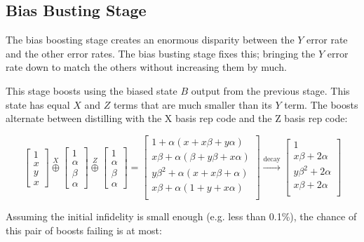 \documentclass[onecolumn,unpublished,a4paper]{quantumarticle}
\theoremstyle{definition}
\theoremstyle{definition}
\theoremstyle{definition}
\begin{document}
\subsection{Bias Busting Stage}

The bias boosting stage creates an enormous disparity between the $Y$ error rate and the other error rates.
The bias busting stage fixes this; bringing the $Y$ error rate down to match the others without increasing them by much.

This stage boosts using the biased state $B$ output from the previous stage.
This state has equal $X$ and $Z$ terms that are much smaller than its $Y$ term.
The boosts alternate between distilling with the X basis rep code and the Z basis rep code:

\begin{equation}
\begin{bmatrix}1\\x\\y\\x\end{bmatrix}
\stackrel{X}{\oplus}
\begin{bmatrix}1\\\alpha\\\beta\\\alpha\end{bmatrix}
\stackrel{Z}{\oplus}
\begin{bmatrix}1\\\alpha\\\beta\\\alpha\end{bmatrix}
=\begin{bmatrix}
1 + \alpha(x + x\beta + y\alpha)\\
x\beta + \alpha(\beta + y\beta + x\alpha)\\
y\beta^2 + \alpha(x + x\beta + \alpha)\\
x\beta + \alpha(1 + y + x\alpha)\\
\end{bmatrix}
\xrightarrow{\text{decay}}
\begin{bmatrix}
1\\
x\beta + 2\alpha\\
y\beta^2 + 2\alpha\\
x\beta + 2\alpha\\
\end{bmatrix}
\end{equation}

Assuming the initial infidelity is small enough (e.g. less than 0.1\%), the chance of this pair of boosts failing is at most:
\end{document}
